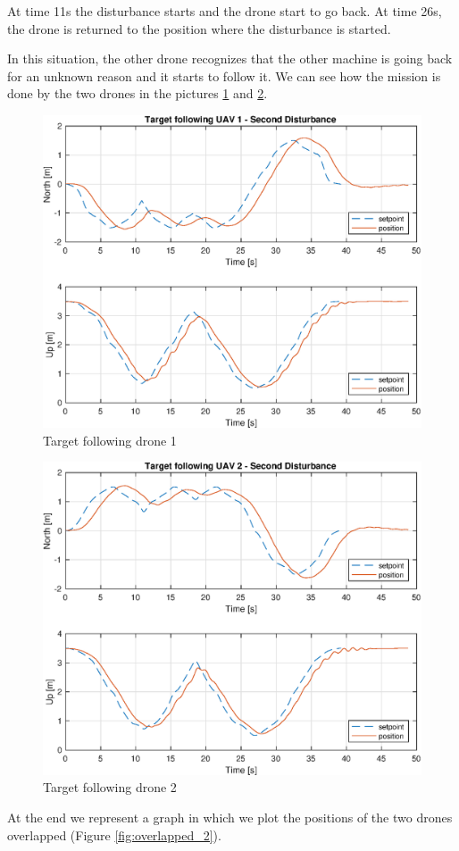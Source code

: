 At time 11s the disturbance starts and the drone start to go back. At time 26s,
the drone is returned to the position where the disturbance is started.

In this situation, the other drone recognizes that the other machine is going back
for an unknown reason and it starts to follow it. We can see how the mission is done
by the two drones in the pictures \ref{fig:following_1_2} and \ref{fig:following_2_2}.

\begin{figure}
\centering
\includegraphics[width=0.7\linewidth]{chapters/chapter-04/figures/following_1_2.eps}
\caption{Target following drone 1}
\label{fig:following_1_2}
\end{figure}

\begin{figure}
\centering
\includegraphics[width=0.7\linewidth]{chapters/chapter-04/figures/following_2_2.eps}
\caption{Target following drone 2}
\label{fig:following_2_2}
\end{figure}

At the end we represent a graph in which we plot the positions of the two drones overlapped
(Figure \ref{fig:overlapped_2}).


